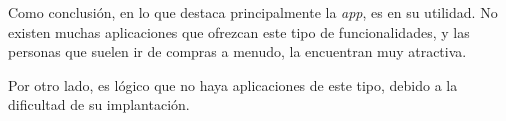Como conclusión, en lo que destaca principalmente la \textit{app}, es en su utilidad. No existen muchas aplicaciones que ofrezcan este tipo de funcionalidades, y las personas que suelen ir de compras a menudo, la encuentran muy atractiva.

Por otro lado, es lógico que no haya aplicaciones de este tipo, debido a la dificultad de su implantación.
